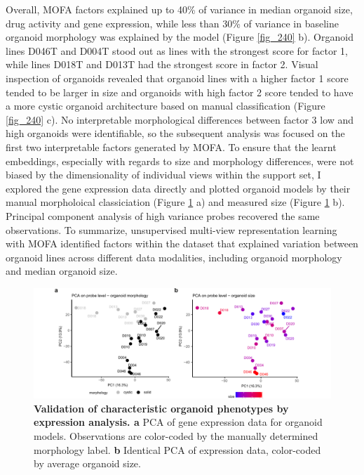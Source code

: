 \begin{flushleft}
\bigbreak
Overall, MOFA factors explained up to 40\% of variance in median organoid size, drug activity and gene expression, while less than 30\% of variance in baseline organoid morphology was explained by the model (Figure \ref{fig_240} b). Organoid lines D046T and D004T stood out as lines with the strongest score for factor 1, while lines D018T and D013T had the strongest score in factor 2. Visual inspection of organoids revealed that organoid lines with a higher factor 1 score tended to be larger in size and organoids with high factor 2 score tended to have a more cystic organoid architecture based on manual classification (Figure \ref{fig_240} c). No interpretable morphological differences between factor 3 low and high organoids were identifiable, so the subsequent analysis was focused on the first two interpretable factors generated by MOFA. To ensure that the learnt embeddings, especially with regards to size and morphology differences, were not biased by the dimensionality of individual views within the support set, I explored the gene expression data directly and plotted organoid models by their manual morpholoical classiciation (Figure \ref{fig_241} a) and measured size (Figure \ref{fig_241} b). Principal component analysis of high variance probes recovered the same observations. To summarize, unsupervised multi-view representation learning with MOFA identified factors within the dataset that explained variation between organoid lines across different data modalities, including organoid morphology and median organoid size. 

\begin{figure}[h!]
\centering
\includegraphics[width=\textwidth,
                height=\textheight,
                keepaspectratio]{figures/promise/pdf/fig_4_1.pdf}
\caption{\textbf{Validation of characteristic organoid phenotypes by expression analysis. a} PCA of gene expression data for organoid models. Observations are color-coded by the manually determined morphology label. \textbf{b} Identical PCA of expression data, color-coded by average organoid size.}
\label{fig_241}
\end{figure}



\end{flushleft}
